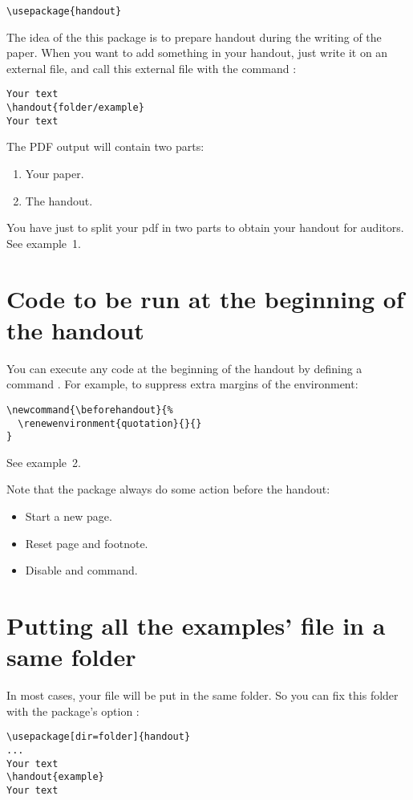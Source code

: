 \documentclass{ltxdockit}[2011/03/25]
\begin{document}
\begin{verbatim}
\usepackage{handout}
\end{verbatim}
The idea of the this package is to prepare handout during the writing of the paper. When you want to add something in your handout, just write it on an external file, and call this external file with the command  :

\begin{verbatim}
Your text
\handout{folder/example}
Your text
\end{verbatim}

The PDF output will contain two parts:
\begin{enumerate}
  \item Your paper.
  \item The handout.
\end{enumerate}

You have just to split your pdf in two parts to obtain your handout for auditors.
See example~1.

\section{Code to be run at the beginning of the handout}

You can execute any code at the beginning of the handout by defining a command . For example, to suppress extra margins of the  environment:
\begin{verbatim}
\newcommand{\beforehandout}{%
  \renewenvironment{quotation}{}{}
}
\end{verbatim}
See example~2.

Note that the package always do some action before the handout:
\begin{itemize}
  \item Start a new page.
  \item Reset page and footnote.
  \item Disable  and  command.
\end{itemize}
\section{Putting all the examples' file in a same folder}

In most cases, your file will be put in the same folder. So you can fix this folder with the package's option :
\begin{verbatim}
\usepackage[dir=folder]{handout}
...
Your text
\handout{example}
Your text
\end{verbatim}
\end{document}
